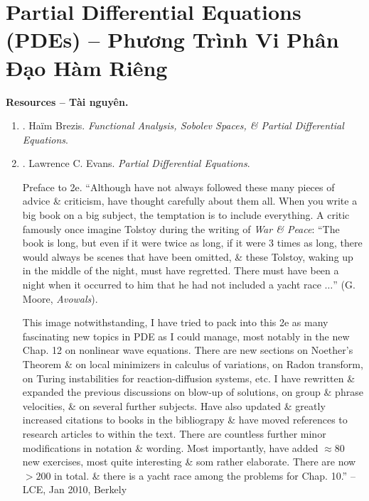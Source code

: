 \documentclass{article}
\begin{document}

\section{Partial Differential Equations (PDEs) -- Phương Trình Vi Phân Đạo Hàm Riêng}
\textbf{\textsf{Resources -- Tài nguyên.}}
\begin{enumerate}
	\item \cite{Brezis2011}. {\sc Ha\"im Brezis}. {\it Functional Analysis, Sobolev Spaces, \& Partial Differential Equations}.
	\item \cite{Evans2010}. {\sc Lawrence C. Evans}. {\it Partial Differential Equations}.
	
	{\sf Preface to 2e.} ``Although have not always followed these many pieces of advice \& criticism, have thought carefully about them all. When you write a big book on a big subject, the temptation is to include everything. A critic famously once imagine Tolstoy during the writing of {\it War \& Peace}: ``The book is long, but even if it were twice as long, if it were 3 times as long, there would always be scenes that have been omitted, \& these Tolstoy, waking up in the middle of the night, must have regretted. There must have been a night when it occurred to him that he had not included a yacht race $\ldots$'' ({\sc G. Moore}, {\it Avowals}).
	
	This image notwithstanding, I have tried to pack into this 2e as many fascinating new topics in PDE as I could manage, most notably in the new Chap. 12 on nonlinear wave equations. There are new sections on Noether's Theorem \& on local minimizers in calculus of variations, on Radon transform, on Turing instabilities for reaction-diffusion systems, etc. I have rewritten \& expanded the previous discussions on blow-up of solutions, on group \& phrase velocities, \& on several further subjects. Have also updated \& greatly increased citations to books in the bibliograpy \& have moved references to research articles to within the text. There are countless further minor modifications in notation \& wording. Most importantly, have added $\approx80$ new exercises, most quite interesting \& som rather elaborate. There are now $> 200$ in total. \& there is a yacht race among the problems for Chap. 10.'' -- LCE, Jan 2010, Berkely
		

\end{enumerate}
\end{document}
